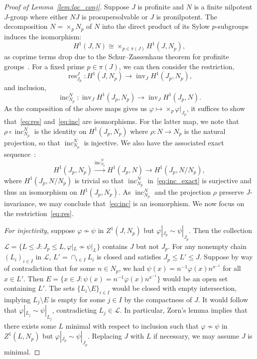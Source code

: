 \documentclass{amsart}
\theoremstyle{definition}
\theoremstyle{remark}
\numberwithin{equation}{section}
\newcommand{\iso}{\cong}
\renewcommand{\phi}{\varphi}
\DeclareMathOperator{\inv}{inv}
\DeclareMathOperator{\res}{res}
\DeclareMathOperator{\inc}{inc}
\begin{document}
\begin{proof}[Proof of Lemma~\ref{lem:loc_conj}]
	Suppose $J$ is profinite and $N$ is a finite nilpotent $J$-group where either $NJ$ is prosupersolvable or $J$ is pronilpotent. The decomposition $N=\times_p N_p$ of $N$ into the direct product of its Sylow $p$-subgroups~\cite[Prop.~2.3.8]{Rib10} induces the isomorphism:
	\begin{equation}
		\label{eq:prod_init}
		H^1(J,N) \iso \times_{p\in \pi(J)} H^1(J,N_p),
	\end{equation}
	as coprime terms drop due to the Schur--Zassenhaus theorem for profinite groups~\cite[Thm.~2.3.15]{Rib10}. For a fixed prime $p\in \pi(J)$, we can then consider the restriction,
	\begin{equation}
		\label{eq:res}
		\res^J_{J_p}: H^1(J,N_p) \to \inv_J H^1(J_p, N_p),
	\end{equation}
	and inclusion,
	\begin{equation}
		\label{eq:inc}
		\inc^N_{N_p}: \inv_J H^1(J_p,N_p) \to \inv_J H^1(J_p, N).
	\end{equation}
	As the composition of the above maps gives us $\phi \mapsto \times_ p \phi|_{J_p}$, it suffices to show that~\eqref{eq:res} and~\eqref{eq:inc} are isomorphisms. For the latter map, we note that $\rho\circ \inc^N_{N_p}$ is the identity on $H^1(J_p,N_p)$ where $\rho: N \to N_p$ is the natural projection, so that $\inc^N_{N_p}$ is injective. We also have the associated exact sequence~\cite[Prop.~38 in \S{}I.5.5]{Ser02}:
	\begin{equation}
		\label{eq:inc_exact}
		H^1(J_p,N_p) \xrightarrow{\inc^N_{N_p}} H^1(J_p, N) \to H^1(J_p, N/N_p),
	\end{equation}
	where $H^1(J_p, N/N_p)$ is trivial so that $\inc^N_{N_p}$ in~\eqref{eq:inc_exact} is surjective and thus an isomorphism on $H^1(J_p,N_p)$. As $\inc^N_{N_p}$ and the projection $\rho$ preserve $J$-invariance, we may conclude that~\eqref{eq:inc} is an isomorphism. We now focus on the restriction~\eqref{eq:res}.

	\emph{For injectivity}, suppose $\phi\nsim\psi$ in $Z^1(J,N_p)$ but $\phi|_{J_p} \sim \psi|_{J_p}$. Then the collection $\mathcal L = \{ L \leq J: J_p \leq L, \phi|_L \nsim \psi|_L\}$ contains $J$ but not $J_p$. For any nonempty chain $(L_i)_{i \in I}$ in $\mathcal L$, $L'=\cap_{i\in I} L_i$ is closed and satisfies $J_p \leq L' \leq J$. Suppose by way of contradiction that for some $n\in N_p$, we had $\psi(x) = n^{-1} \phi(x) n^{x^{-1}}$ for all $x\in L'$. Then $E = \{ x \in J:  \psi(x) = n^{-1} \phi(x) n^{x^{-1}} \}$ would be an open set containing $L'$. The sets $\{L_i \setminus E\}_{i\in I}$ would be closed with empty intersection, implying $L_j \setminus E$ is empty for some $j\in I$ by the compactness of $J$. It would follow that $\phi|_{L_j} \sim \psi|_{L_j}$, contradicting $L_j \in \mathcal L$. In particular, Zorn's lemma implies that there exists some $L$ minimal with respect to inclusion such that $\phi\nsim\psi$ in $Z^1(L,N_p)$ but $\phi|_{J_p} \sim \psi|_{J_p}$. Replacing $J$ with $L$ if necessary, we may assume $J$ is minimal.


\end{proof}
\end{document}
